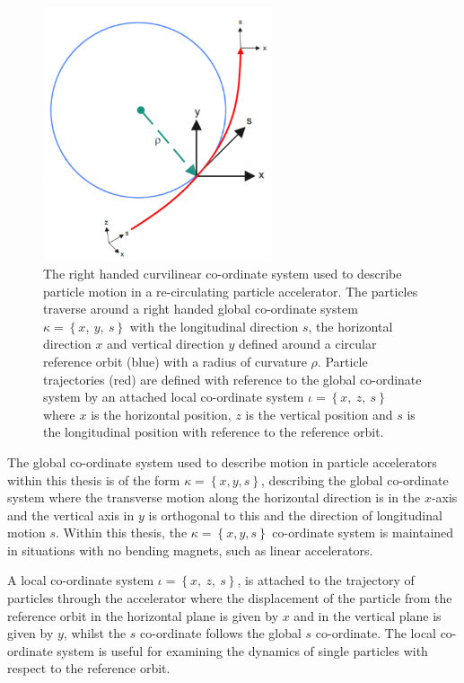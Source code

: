 \documentclass[../main.tex]{subfiles}
\begin{document}
\begin{figure}[!h]
\centering
\includegraphics[width=0.6\textwidth]{Figures/Energy_Recovery_Linac_Design/Accelerator_Coord_System_fixed.pdf}
\caption{The right handed curvilinear co-ordinate system used to describe particle motion in a re-circulating particle accelerator. The particles traverse around a right handed global co-ordinate system $\kappa=\left\{x,~y,~s\right\}$ with the longitudinal direction $s$, the horizontal direction $x$ and vertical direction $y$ defined around a circular reference orbit (blue) with a radius of curvature $\rho$. Particle trajectories (red)
are defined with reference to the global co-ordinate system by an attached local co-ordinate system $\iota=\left\{x,~z,~s\right\}$ where $x$ is the horizontal position, $z$ is the vertical position and $s$ is the longitudinal position with reference to the reference orbit.}
\label{fig:accelerator_coord_system}
\end{figure}

The global co-ordinate system used to describe motion in particle accelerators within this thesis is of the form $\kappa = \left\{x,y,s\right\}$, describing the global co-ordinate system where the transverse motion along the horizontal direction is in the $x$-axis and the vertical axis in $y$ is orthogonal to this and the direction of longitudinal motion $s$. Within this thesis, the $\kappa = \left\{x,y,s\right\}$ co-ordinate system is maintained in situations with no bending magnets, such as linear accelerators.  

A local co-ordinate system $\iota=\left\{x,~z,~s\right\}$, is attached to the trajectory of particles through the accelerator where the displacement of the particle from the reference orbit in the horizontal plane is given by $x$ and in the vertical plane is given by $y$, whilst the $s$ co-ordinate follows the global $s$ co-ordinate. The local co-ordinate system is useful for examining the dynamics of single particles with respect to the reference orbit.
\end{document}
